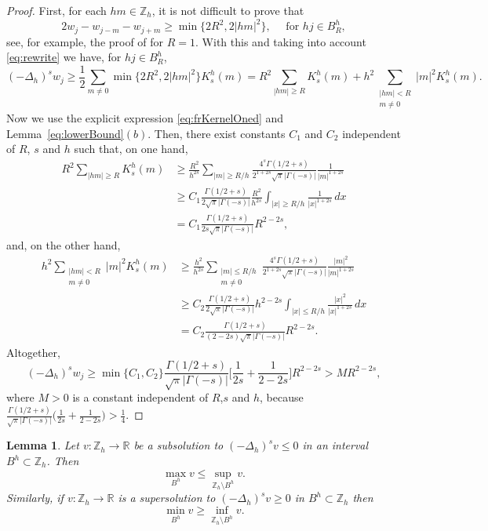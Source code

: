 \documentclass[a4paper,11pt,reqno]{amsart}
\newcommand{\R}{\mathbb{R}}
\newcommand{\Z}{\mathbb{Z}}
\newtheorem{lem}[thm]{Lemma}
\theoremstyle{definition}
\numberwithin{equation}{section}
\begin{document}
\begin{proof}
First, for each $hm\in\Z_h$, it is not difficult to prove that
\[
2w_j-w_{j-m}-w_{j+m}\ge \min\{2R^2, 2|hm|^2\}, \quad \text{ for } hj \in B_R^h,
\]
see, for example, the proof of \cite[Lemma 5]{Huang-Oberman} for $R=1$.
With this and taking into account \eqref{eq:rewrite} we have, for $hj\in B_R^h$,
\[
(-\Delta_h)^sw_{j} \ge \frac{1}{2} \sum_{m\neq 0}
\min\{2R^2, 2|hm|^2\}K^h_s(m)
= R^2\sum_{|hm|\ge R}K^h_s(m)+h^2
\sum_{\substack {|hm|< R\\ m\neq 0}}|m|^2K^h_s(m).
\]
Now we use the explicit expression \eqref{eq:frKernelOned} and
Lemma~\ref{eq:lowerBound}$(b)$. Then, there exist constants $C_1$
and $C_2$ independent of $R$, $s$ and $h$ such that, on one hand,
\begin{align*}
R^2\sum_{|hm|\ge R}K^h_s(m)&\ge \frac{R^2}{h^{2s}}
\sum_{|m|\ge R/h} \frac{4^s\Gamma(1/2+s)}{2^{1+2s}\sqrt{\pi}|\Gamma(-s)|}
\frac{1}{|m|^{1+2s}} \\
&\ge C_1 \frac{\Gamma(1/2+s)}{2\sqrt{\pi}|\Gamma(-s)|} \frac{R^2}{h^{2s}}
\int_{|x|\ge R/h} \frac{1}{|x|^{1+2s}}\,dx \\
&= C_1\frac{\Gamma(1/2+s)}{2s\sqrt{\pi}|\Gamma(-s)|}R^{2-2s},
\end{align*}
and, on the other hand,
\begin{align*}
h^2\sum_{\substack {|hm|< R\\ m\neq 0}}|m|^2K^h_s(m)
&\ge \frac{h^2}{h^{2s}}
\sum_{\substack {|m|\le R/h\\ m\neq 0}}
\frac{4^s\Gamma(1/2+s)}{2^{1+2s}\sqrt{\pi}|\Gamma(-s)|} \frac{|m|^2}{|m|^{1+2s}} \\
&\ge C_2\frac{\Gamma(1/2+s)}{2\sqrt{\pi}|\Gamma(-s)|}h^{2-2s}
\int_{|x|\le R/h}\frac{|x|^2}{|x|^{1+2s}}\,dx\\
&=C_2\frac{\Gamma(1/2+s)}{(2-2s)\sqrt{\pi}|\Gamma(-s)|}R^{2-2s}.
\end{align*}
Altogether,
\[
(-\Delta_h)^sw_{j}\ge \min\{C_1,C_2\}\frac{\Gamma(1/2+s)}{\sqrt{\pi}|\Gamma(-s)|}
\bigg[\frac{1}{2s}+\frac{1}{2-2s}\bigg]R^{2-2s}>MR^{2-2s},
\]
where $M>0$ is a constant independent of $R$,$s$ and $h$,
because $\frac{\Gamma(1/2+s)}{\sqrt{\pi}|\Gamma(-s)|}
\big(\frac{1}{2s}+\frac{1}{2-2s}\big)>\frac14$.
\end{proof}

\begin{lem}
\label{lem:maximum}
Let $v:\Z_h \to \R$ be a subsolution to
$(-\Delta_h)^sv\le 0$ in an interval $B^h\subset\Z_h$. Then
\[
\max_{B^h}v\le \sup_{\Z_h\setminus B^h}v.
\]
Similarly, if $v:\Z_h\to\R$ is a supersolution to $(-\Delta_h)^sv\ge 0$ in $B^h\subset\Z_h$ then
\[
\min_{B^h}v\ge \inf_{\Z_h\setminus B^h}v.
\]
\end{lem}
\end{document}
